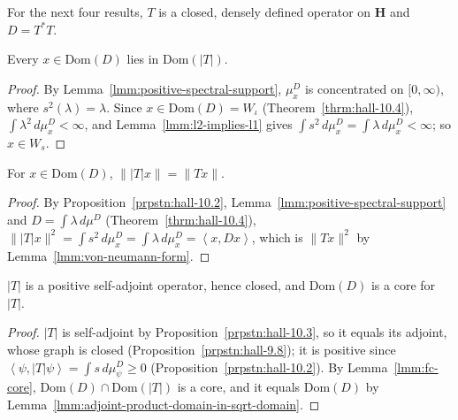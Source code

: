 For the next four results, $T$ is a closed, densely defined operator on $\mathbf{H}$ and $D = T^*T$.

\begin{lemma}
    \label{lmm:adjoint-product-domain-in-sqrt-domain}
    \leanok
    Every $x \in \text{Dom}(D)$ lies in $\text{Dom}(|T|)$.
\end{lemma}
\begin{proof}
    \leanok
    By Lemma~\ref{lmm:positive-spectral-support}, $\mu^D_x$ is concentrated on $[0, \infty)$, where $s^2(\lambda) = \lambda$. Since $x \in \text{Dom}(D) = W_\iota$ (Theorem~\ref{thrm:hall-10.4}), $\int \lambda^2 \, d\mu^D_x < \infty$, and Lemma~\ref{lmm:l2-implies-l1} gives $\int s^2 \, d\mu^D_x = \int \lambda \, d\mu^D_x < \infty$; so $x \in W_s$.
\end{proof}

\begin{lemma}
    \label{lmm:absolute-value-norm-on-core}
    \leanok
    For $x \in \text{Dom}(D)$, $\||T|x\| = \|Tx\|$.
\end{lemma}
\begin{proof}
    \leanok
    By Proposition~\ref{prpstn:hall-10.2}, Lemma~\ref{lmm:positive-spectral-support} and $D = \int \lambda \, d\mu^D$ (Theorem~\ref{thrm:hall-10.4}), $\||T|x\|^2 = \int s^2 \, d\mu^D_x = \int \lambda \, d\mu^D_x = \left< x, Dx \right>$, which is $\|Tx\|^2$ by Lemma~\ref{lmm:von-neumann-form}.
\end{proof}

\begin{lemma}
    \label{lmm:absolute-value-closed}
    \leanok
    $|T|$ is a positive self-adjoint operator, hence closed, and $\text{Dom}(D)$ is a core for $|T|$.
\end{lemma}
\begin{proof}
    \leanok
    $|T|$ is self-adjoint by Proposition~\ref{prpstn:hall-10.3}, so it equals its adjoint, whose graph is closed (Proposition~\ref{prpstn:hall-9.8}); it is positive since $\left< \psi, |T|\psi \right> = \int s \, d\mu^D_\psi \ge 0$ (Proposition~\ref{prpstn:hall-10.2}). By Lemma~\ref{lmm:fc-core}, $\text{Dom}(D) \cap \text{Dom}(|T|)$ is a core, and it equals $\text{Dom}(D)$ by Lemma~\ref{lmm:adjoint-product-domain-in-sqrt-domain}.
\end{proof}

